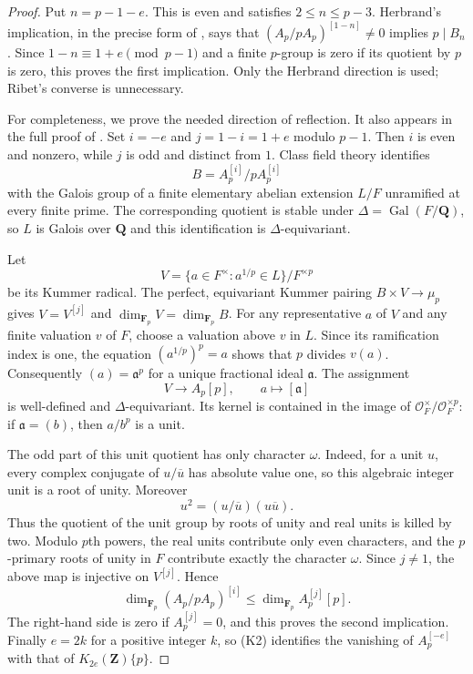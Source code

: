 \begin{proof}
Put $n=p-1-e$. This is even and satisfies $2\le n\le p-3$.
Herbrand's implication, in the precise form of
\cite[Main Theorem (1.1), p.~151]{Ribet1976}, says that
$(A_p/pA_p)^{[1-n]}\ne0$ implies $p\mid B_n$.
Since $1-n\equiv1+e\pmod{p-1}$ and a finite $p$-group is zero
if its quotient by $p$ is zero, this proves the first implication.
Only the Herbrand direction is used; Ribet's converse is unnecessary.

For completeness, we prove the needed direction of reflection.
It also appears in the full proof of
\cite[Theorem~4.4.2, pp.~111--113, and Corollary~4.4.4,
p.~113]{K17SharifiReflection}.
Set $i=-e$ and $j=1-i=1+e$ modulo $p-1$.
Then $i$ is even and nonzero, while $j$ is odd and distinct from $1$.
Class field theory identifies
\[
 B=A_p^{[i]}/pA_p^{[i]}
\]
with the Galois group of a finite elementary abelian extension $L/F$
unramified at every finite prime. The corresponding quotient is stable
under $\Delta=\operatorname{Gal}(F/\mathbf Q)$, so $L$ is Galois
over $\mathbf Q$ and this identification is $\Delta$-equivariant.

Let
\[
 V=\{a\in F^\times:a^{1/p}\in L\}/F^{\times p}
\]
be its Kummer radical. The perfect, equivariant Kummer pairing
$B\times V\to\mu_p$ gives
$V=V^{[j]}$ and $\dim_{\mathbf F_p}V=\dim_{\mathbf F_p}B$.
For any representative $a$ of $V$ and any finite valuation $v$ of $F$,
choose a valuation above $v$ in $L$. Since its ramification index is one,
the equation $(a^{1/p})^p=a$ shows that $p$ divides $v(a)$.
Consequently $(a)=\mathfrak a^p$ for a unique fractional ideal
$\mathfrak a$. The assignment
\[
             V\longrightarrow A_p[p],\qquad
             a\longmapsto[\mathfrak a]
\]
is well-defined and $\Delta$-equivariant. Its kernel is contained in
the image of $\mathcal O_F^\times/\mathcal O_F^{\times p}$:
if $\mathfrak a=(b)$, then $a/b^p$ is a unit.

The odd part of this unit quotient has only character $\omega$.
Indeed, for a unit $u$, every complex conjugate of $u/\overline u$
has absolute value one, so this algebraic integer unit is a root of
unity. Moreover
\[
 u^2=(u/\overline u)(u\overline u).
\]
Thus the quotient of the unit group by roots of unity and real units
is killed by two. Modulo $p$th powers, the real units contribute only
even characters, and the $p$-primary roots of unity in $F$ contribute
exactly the character $\omega$. Since $j\ne1$, the above map is
injective on $V^{[j]}$. Hence
\[
 \dim_{\mathbf F_p}(A_p/pA_p)^{[i]}
 \le \dim_{\mathbf F_p}A_p^{[j]}[p].
\]
The right-hand side is zero if $A_p^{[j]}=0$, and this proves the
second implication. Finally $e=2k$ for a positive integer $k$, so (K2)
identifies the vanishing of $A_p^{[-e]}$ with that of
$K_{2e}(\mathbf Z)\{p\}$.
\end{proof}

